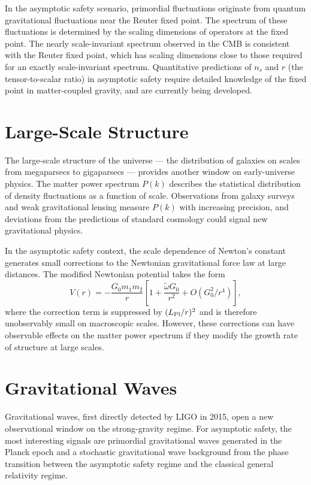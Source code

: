 \documentclass[11pt, twoside, openright]{book}
\theoremstyle{dotted}
\theoremstyle{definition}
\begin{document}
In the asymptotic safety scenario, primordial fluctuations originate from quantum
gravitational fluctuations near the Reuter fixed point. The spectrum of these
fluctuations is determined by the scaling dimensions of operators at the fixed
point. The nearly scale-invariant spectrum observed in the CMB is consistent with
the Reuter fixed point, which has scaling dimensions close to those required for
an exactly scale-invariant spectrum. Quantitative predictions of $n_s$ and $r$
(the tensor-to-scalar ratio) in asymptotic safety require detailed knowledge of
the fixed point in matter-coupled gravity, and are currently being developed.

\section{Large-Scale Structure}

The large-scale structure of the universe --- the distribution of galaxies on scales
from megaparsecs to gigaparsecs --- provides another window on early-universe physics.
The matter power spectrum $P(k)$ describes the statistical distribution of density
fluctuations as a function of scale. Observations from galaxy surveys and
weak gravitational lensing measure $P(k)$ with increasing precision, and deviations
from the predictions of standard cosmology could signal new gravitational physics.

In the asymptotic safety context, the scale dependence of Newton's constant generates
small corrections to the Newtonian gravitational force law at large distances. The
modified Newtonian potential takes the form
\begin{equation}
  V(r) = -\frac{G_0 m_1 m_2}{r}\left[1 + \frac{\tilde\omega G_0}{r^2} + O(G_0^2/r^4)\right],
  \label{eq:modified_potential}
\end{equation}
where the correction term is suppressed by $(L_{\rm Pl}/r)^2$ and is therefore
unobservably small on macroscopic scales. However, these corrections can have
observable effects on the matter power spectrum if they modify the growth rate of
structure at large scales.

\section{Gravitational Waves}

Gravitational waves, first directly detected by LIGO in 2015, open a new
observational window on the strong-gravity regime. For asymptotic safety, the most
interesting signals are primordial gravitational waves generated in the Planck epoch
and a stochastic gravitational wave background from the phase transition between
the asymptotic safety regime and the classical general relativity regime.
\end{document}
